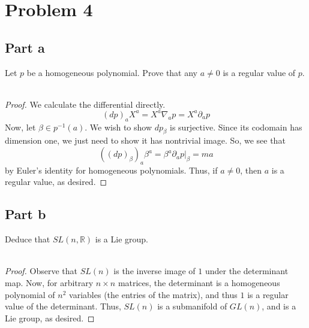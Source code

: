 \documentclass[fontsize=11pt]{scrartcl} %
\numberwithin{equation}{section} %
\numberwithin{figure}{section} %
\numberwithin{table}{section} %
\newcommand{\R}{\mathbb{R}}
\begin{document}
\newpage

\section*{Problem 4}
\subsection*{Part a}
Let $p$ be a homogeneous polynomial. Prove that any $a\neq 0$ is a regular value
of $p$.
\\
\\
\begin{proof}
    We calculate the differential directly.
    \[
        (dp)_aX^a = X^a\nabla_ap = X^a\partial_ap
    \]
    Now, let $\beta\in p^{-1}(a)$. We wish to show $dp_{\beta}$ is surjective.
    Since its codomain has dimension one, we just need to show it has nontrivial
    image. So, we see that
    \[
        ((dp)_{\beta})_a\beta^a = \beta^a\partial_ap|_{\beta} = ma
    \]
    by Euler's identity for homogeneous polynomials. Thus, if $a\neq 0$, then
    $a$ is a regular value, as desired.
\end{proof}

\subsection*{Part b}
Deduce that $SL(n,\R)$ is a Lie group.
\\
\\
\begin{proof}
    Observe that $SL(n)$ is the inverse image of $1$ under the determinant map.
    Now, for arbitrary $n\times n$ matrices, the determinant is a homogeneous
    polynomial of $n^2$ variables (the entries of the matrix), and thus $1$ is a
    regular value of the determinant. Thus, $SL(n)$ is a submanifold of $GL(n)$,
    and is a Lie group, as desired.
\end{proof}
\end{document}
